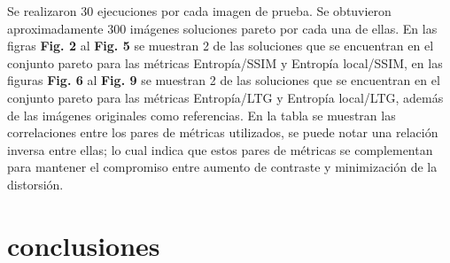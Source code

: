 \documentclass[spanish,twocolumn]{article}
\begin{document}
{ 
 Se realizaron 30 ejecuciones por cada imagen de prueba. Se obtuvieron aproximadamente 300 imágenes soluciones pareto por cada una de ellas. En las figras \textbf {Fig. 2} al \textbf {Fig. 5}  se muestran 2 de las soluciones que se encuentran en el conjunto pareto para las métricas Entropía/SSIM y Entropía local/SSIM, en las figuras \textbf {Fig. 6}  al \textbf {Fig. 9} se muestran 2 de las soluciones que se encuentran en el conjunto pareto para las métricas Entropía/LTG y Entropía local/LTG, además de las imágenes originales como referencias. En la tabla se muestran las correlaciones entre los pares de métricas utilizados, se puede notar una relación inversa entre ellas; lo cual indica que estos pares de métricas se complementan para mantener el compromiso entre aumento de contraste y minimización de la distorsión. 

\section{conclusiones}
\label{sec:conclusion}


\onecolumn
\noindent\begin{minipage}[b]{1.0\linewidth}
  \centering
   

\end{minipage}}
\end{document}
